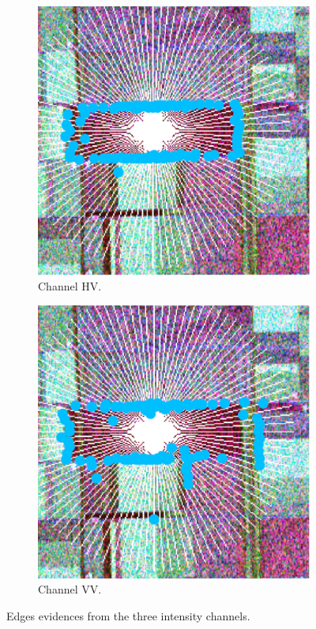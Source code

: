 \documentclass{article}
\begin{document}
\begin{figure}[hbt]
\begin{subfigure}{0.32\linewidth}
    \includegraphics[width=\linewidth]{figures/hv.pdf}
    \caption{Channel HV.}
    \label{subfig:2ed}
  \end{subfigure}
  \begin{subfigure}{0.32\linewidth}
    \centering
    \includegraphics[width=\linewidth]{figures/vv_c.pdf}
    \caption{Channel VV.}
    \label{subfig:3ed}
  \end{subfigure}
  \caption{Edges evidences from the three intensity channels.}
  \label{fig:all-ed}
\end{figure}
\end{document}

